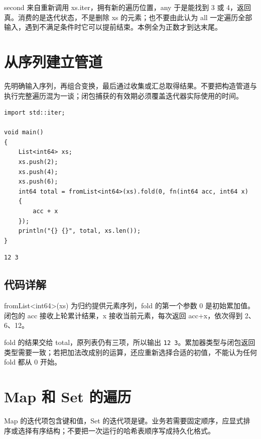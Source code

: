 second 来自重新调用 xs.iter，拥有新的遍历位置，any 于是能找到 3 或 4，返回真。消费的是迭代状态，不是删除 xs 的元素；也不要由此认为 all 一定遍历全部输入，遇到不满足条件时它可以提前结束。本例全为正数才到达末尾。

\section{从序列建立管道}

先明确输入序列，再组合变换，最后通过收集或汇总取得结果。不要把构造管道与执行完整遍历混为一谈；闭包捕获的有效期必须覆盖迭代器实际使用的时间。

\par
\medskip
\begin{lstlisting}[style=chali]
import std::iter;

void main()
{
    List<int64> xs;
    xs.push(2);
    xs.push(4);
    xs.push(6);
    int64 total = fromList<int64>(xs).fold(0, fn(int64 acc, int64 x)
    {
        acc + x
    });
    println("{} {}", total, xs.len());
}
\end{lstlisting}
\par
\medskip

\par
\medskip
\begin{lstlisting}[style=out]
12 3
\end{lstlisting}
\par
\medskip

\subsection*{代码详解}

fromList<int64>(xs) 为归约提供元素序列，fold 的第一个参数 0 是初始累加值。闭包的 acc 接收上轮累计结果，x 接收当前元素，每次返回 acc+x，依次得到 2、6、12。

fold 的结果交给 total，原列表仍有三项，所以输出 \texttt{12 3}。累加器类型与闭包返回类型需要一致；若把加法改成别的运算，还应重新选择合适的初值，不能认为任何 fold 都从 0 开始。

\section{Map 和 Set 的遍历}

Map 的迭代项包含键和值，Set 的迭代项是键。业务若需要固定顺序，应显式排序或选择有序结构；不要把一次运行的哈希表顺序写成持久化格式。

